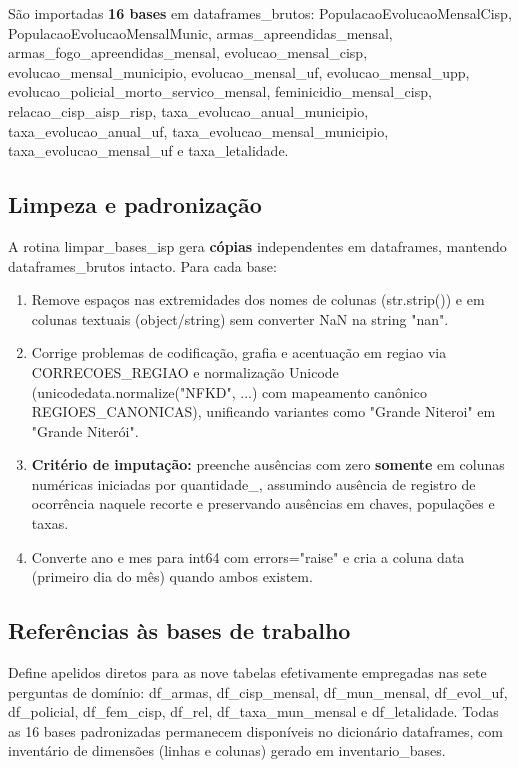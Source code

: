 \documentclass[11pt,a4paper]{article}
\newcommand{\code}[1]{{\ttfamily\footnotesize\allowbreak #1}}
\begin{document}
São importadas \textbf{16 bases} em \code{dataframes\_brutos}: \code{PopulacaoEvolucaoMensalCisp}, \code{PopulacaoEvolucaoMensalMunic}, \code{armas\_apreendidas\_mensal}, \code{armas\_fogo\_apreendidas\_mensal}, \code{evolucao\_mensal\_cisp}, \code{evolucao\_mensal\_municipio}, \code{evolucao\_mensal\_uf}, \code{evolucao\_mensal\_upp}, \code{evolucao\_policial\_morto\_servico\_mensal}, \code{feminicidio\_mensal\_cisp}, \code{relacao\_cisp\_aisp\_risp}, \code{taxa\_evolucao\_anual\_municipio}, \code{taxa\_evolucao\_anual\_uf}, \code{taxa\_evolucao\_mensal\_municipio}, \code{taxa\_evolucao\_mensal\_uf} e \code{taxa\_letalidade}.

\subsection{Limpeza e padronização}
A rotina \code{limpar\_bases\_isp} gera \textbf{cópias} independentes em \code{dataframes}, mantendo \code{dataframes\_brutos} intacto. Para cada base:
\begin{enumerate}
  \setlength{\itemsep}{2pt}\setlength{\parskip}{0pt}
  \item Remove espaços nas extremidades dos nomes de colunas (\code{str.strip()}) e em colunas textuais (\code{object}/\code{string}) sem converter \code{NaN} na string \code{"nan"}.
  \item Corrige problemas de codificação, grafia e acentuação em \code{regiao} via \code{CORRECOES\_REGIAO} e normalização Unicode (\code{unicodedata.normalize("NFKD", ...)} com mapeamento canônico \code{REGIOES\_CANONICAS}), unificando variantes como \code{"Grande Niteroi"} em \code{"Grande Niterói"}.
  \item \textbf{Critério de imputação:} preenche ausências com zero \textbf{somente} em colunas numéricas iniciadas por \code{quantidade\_}, assumindo ausência de registro de ocorrência naquele recorte e preservando ausências em chaves, populações e taxas.
  \item Converte \code{ano} e \code{mes} para \code{int64} com \code{errors="raise"} e cria a coluna \code{data} (primeiro dia do mês) quando ambos existem.
\end{enumerate}

\subsection{Referências às bases de trabalho}
Define apelidos diretos para as nove tabelas efetivamente empregadas nas sete perguntas de domínio: \code{df\_armas}, \code{df\_cisp\_mensal}, \code{df\_mun\_mensal}, \code{df\_evol\_uf}, \code{df\_policial}, \code{df\_fem\_cisp}, \code{df\_rel}, \code{df\_taxa\_mun\_mensal} e \code{df\_letalidade}. Todas as 16 bases padronizadas permanecem disponíveis no dicionário \code{dataframes}, com inventário de dimensões (\code{linhas} e \code{colunas}) gerado em \code{inventario\_bases}.
\end{document}
